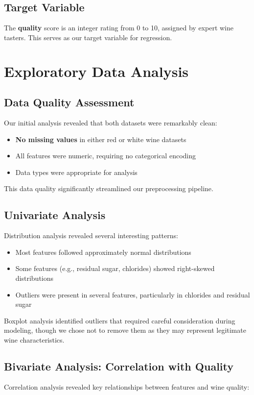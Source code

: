 \documentclass[12pt]{article}
\begin{document}
\subsection{Target Variable}
The \textbf{quality} score is an integer rating from 0 to 10, assigned by expert wine tasters. This serves as our target variable for regression.

\section{Exploratory Data Analysis}

\subsection{Data Quality Assessment}
Our initial analysis revealed that both datasets were remarkably clean:
\begin{itemize}
    \item \textbf{No missing values} in either red or white wine datasets
    \item All features were numeric, requiring no categorical encoding
    \item Data types were appropriate for analysis
\end{itemize}

This data quality significantly streamlined our preprocessing pipeline.

\subsection{Univariate Analysis}
Distribution analysis revealed several interesting patterns:
\begin{itemize}
    \item Most features followed approximately normal distributions
    \item Some features (e.g., residual sugar, chlorides) showed right-skewed distributions
    \item Outliers were present in several features, particularly in chlorides and residual sugar
\end{itemize}

Boxplot analysis identified outliers that required careful consideration during modeling, though we chose not to remove them as they may represent legitimate wine characteristics.

\subsection{Bivariate Analysis: Correlation with Quality}
Correlation analysis revealed key relationships between features and wine quality:
\end{document}
